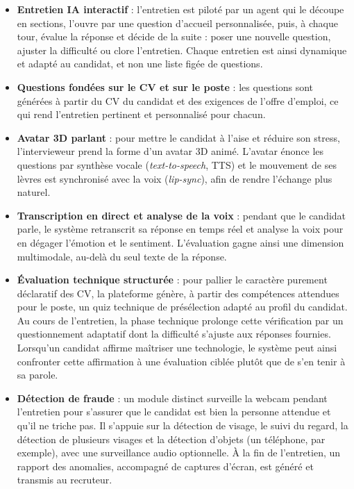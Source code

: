 \begin{itemize}
  \item \textbf{Entretien IA interactif} : l’entretien est piloté par un agent qui le découpe en sections, l’ouvre par une question d’accueil personnalisée, puis, à chaque tour, évalue la réponse et décide de la suite : poser une nouvelle question, ajuster la difficulté ou clore l’entretien. Chaque entretien est ainsi dynamique et adapté au candidat, et non une liste figée de questions.

  \item \textbf{Questions fondées sur le CV et sur le poste} : les questions sont générées à partir du CV du candidat et des exigences de l’offre d’emploi, ce qui rend l’entretien pertinent et personnalisé pour chacun.

  \item \textbf{Avatar 3D parlant} : pour mettre le candidat à l’aise et réduire son stress, l’intervieweur prend la forme d’un avatar 3D animé. L’avatar énonce les questions par synthèse vocale (\textit{text-to-speech}, TTS) et le mouvement de ses lèvres est synchronisé avec la voix (\textit{lip-sync}), afin de rendre l’échange plus naturel.

  \item \textbf{Transcription en direct et analyse de la voix} : pendant que le candidat parle, le système retranscrit sa réponse en temps réel et analyse la voix pour en dégager l’émotion et le sentiment. L’évaluation gagne ainsi une dimension multimodale, au-delà du seul texte de la réponse.

  \item \textbf{Évaluation technique structurée} : pour pallier le caractère purement déclaratif des CV, la plateforme génère, à partir des compétences attendues pour le poste, un quiz technique de présélection adapté au profil du candidat. Au cours de l’entretien, la phase technique prolonge cette vérification par un questionnement adaptatif dont la difficulté s’ajuste aux réponses fournies. Lorsqu’un candidat affirme maîtriser une technologie, le système peut ainsi confronter cette affirmation à une évaluation ciblée plutôt que de s’en tenir à sa parole.

  \item \textbf{Détection de fraude} : un module distinct surveille la webcam pendant l’entretien pour s’assurer que le candidat est bien la personne attendue et qu’il ne triche pas. Il s’appuie sur la détection de visage, le suivi du regard, la détection de plusieurs visages et la détection d’objets (un téléphone, par exemple), avec une surveillance audio optionnelle. À la fin de l’entretien, un rapport des anomalies, accompagné de captures d’écran, est généré et transmis au recruteur.


\end{itemize}
